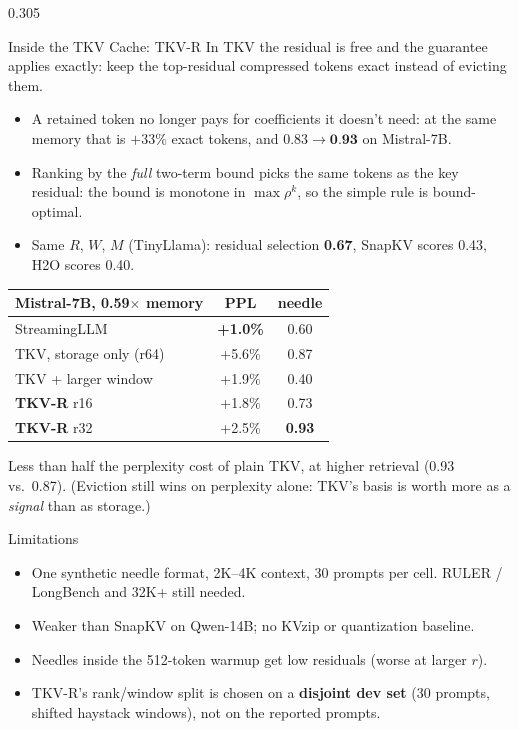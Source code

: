 \documentclass[final]{beamer}
\begin{document}
\begin{frame}[t]
\begin{columns}[t]
\begin{column}{0.305\paperwidth}
\begin{block}{Inside the TKV Cache: TKV-R}
In TKV the residual is free and the guarantee applies exactly: keep the
top-residual compressed tokens exact instead of evicting them.
\vspace{0.2cm}
\begin{itemize}
  \item A retained token no longer pays for coefficients it doesn't need: at the same memory that is $+33\%$ exact tokens, and $0.83 \to \textbf{0.93}$ on Mistral-7B.
  \item Ranking by the \emph{full} two-term bound picks the same tokens as the key residual: the bound is monotone in $\max\rho^k$, so the simple rule is bound-optimal.
  \item Same $R$, $W$, $M$ (TinyLlama): residual selection \textbf{0.67}, SnapKV scores 0.43, H2O scores 0.40.
\end{itemize}
\begin{center}
\begin{tabular}{lcc}
\toprule
Mistral-7B, 0.59$\times$ memory & PPL & needle \\
\midrule
StreamingLLM & \textbf{+1.0\%} & 0.60 \\
TKV, storage only (r64) & +5.6\% & 0.87 \\
TKV + larger window & +1.9\% & 0.40 \\
\textbf{\color{accent}TKV-R} r16 & +1.8\% & 0.73 \\
\textbf{\color{accent}TKV-R} r32 & +2.5\% & \textbf{0.93} \\
\bottomrule
\end{tabular}
\end{center}
\vspace{0.1cm}
Less than half the perplexity cost of plain TKV, at higher retrieval (0.93 vs.\ 0.87). (Eviction still wins on perplexity alone: TKV's basis is worth more as a \emph{signal} than as storage.)
\end{block}

\begin{block}{Limitations}
\begin{itemize}
  \item One synthetic needle format, 2K--4K context, 30 prompts per cell. RULER / LongBench and 32K+ still needed.
  \item Weaker than SnapKV on Qwen-14B; no KVzip or quantization baseline.
  \item Needles inside the 512-token warmup get low residuals (worse at larger $r$).
  \item TKV-R's rank/window split is chosen on a \textbf{disjoint dev set} (30 prompts, shifted haystack windows), not on the reported prompts.
\end{itemize}
\end{block}

\end{column}
\end{columns}

\end{frame}
\end{document}
